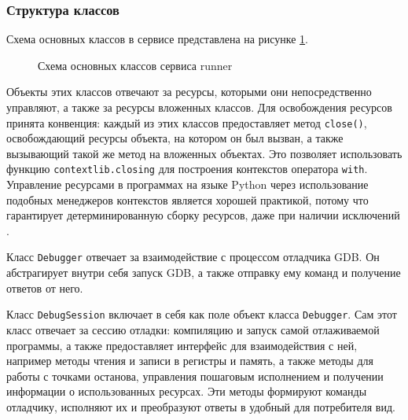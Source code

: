 \documentclass[a4paper,article,14pt]{extarticle}
\begin{document}
\subsubsection{Структура классов}

Схема основных классов в сервисе представлена на рисунке \ref{fig:runner_classes}.

\begin{figure}[ht]
    \begin{center}
        \caption{\label{fig:runner_classes} Схема основных классов сервиса runner}
    \end{center}
\end{figure}

Объекты этих классов отвечают за ресурсы, которыми они непосредственно управляют, а также за ресурсы вложенных классов. Для освобождения ресурсов принята конвенция: каждый из этих классов предоставляет метод \texttt{close()}, освобождающий ресурсы объекта, на котором он был вызван, а также вызывающий такой же метод на вложенных объектах. Это позволяет использовать функцию \texttt{contextlib.closing} для построения контекстов оператора \texttt{with}. Управление ресурсами в программах на языке Python через использование подобных менеджеров контекстов является хорошей практикой, потому что гарантирует детерминированную сборку ресурсов, даже при наличии исключений \cite{fluentpython}.

Класс \texttt{Debugger} отвечает за взаимодействие с процессом отладчика GDB. Он абстрагирует внутри себя запуск GDB, а также отправку ему команд и получение ответов от него.

Класс \texttt{DebugSession} включает в себя как поле объект класса \texttt{Debugger}. Сам этот класс отвечает за сессию отладки: компиляцию и запуск самой отлаживаемой программы, а также предоставляет интерфейс для взаимодействия с ней, например методы чтения и записи в регистры и память, а также методы для работы с точками останова, управления пошаговым исполнением и получении информации о использованных ресурсах. Эти методы формируют команды отладчику, исполняют их и преобразуют ответы в удобный для потребителя вид.
\end{document}
